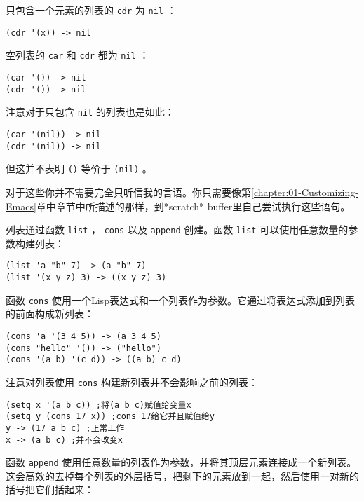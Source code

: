 只包含一个元素的列表的 \texttt{cdr} 为 \texttt{nil} ：

\begin{verbatim}
(cdr '(x)) -> nil
\end{verbatim}

空列表的 \texttt{car} 和 \texttt{cdr} 都为 \texttt{nil} ：

\begin{verbatim}
(car '()) -> nil
(cdr '()) -> nil
\end{verbatim}

注意对于只包含 \texttt{nil} 的列表也是如此：

\begin{verbatim}
(car '(nil)) -> nil
(cdr '(nil)) -> nil
\end{verbatim}

但这并不表明 \texttt{()} 等价于 \texttt{(nil)} 。

对于这些你并不需要完全只听信我的言语。你只需要像第\ref{chapter:01-Customizing-Emacs}章中章节中所描述的那样，到*scratch* buffer里自己尝试执行这些语句。

列表通过函数 \texttt{list} ， \texttt{cons} 以及 \texttt{append} 创建。函数 \texttt{list} 可以使用任意数量的参数构建列表：

\begin{verbatim}
(list 'a "b" 7) -> (a "b" 7)
(list '(x y z) 3) -> ((x y z) 3)
\end{verbatim}

函数 \texttt{cons} 使用一个Lisp表达式和一个列表作为参数。它通过将表达式添加到列表的前面构成新列表：

\begin{verbatim}
(cons 'a '(3 4 5)) -> (a 3 4 5)
(cons "hello" '()) -> ("hello")
(cons '(a b) '(c d)) -> ((a b) c d)
\end{verbatim}

注意对列表使用 \texttt{cons} 构建新列表并不会影响之前的列表：

\begin{verbatim}
(setq x '(a b c)) ;将(a b c)赋值给变量x
(setq y (cons 17 x)) ;cons 17给它并且赋值给y
y -> (17 a b c) ;正常工作
x -> (a b c) ;并不会改变x
\end{verbatim}

函数 \texttt{append} 使用任意数量的列表作为参数，并将其顶层元素连接成一个新列表。这会高效的去掉每个列表的外层括号，把剩下的元素放到一起，然后使用一对新的括号把它们括起来：

